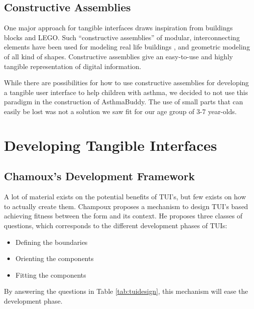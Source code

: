 \subsection{Constructive Assemblies}
One major approach for tangible interfaces draws inspiration from buildings blocks and LEGO\texttrademark. Such ``constructive assemblies'' of modular, interconnecting elements have been used for modeling real life buildings \cite{aish1984architecture}, and geometric modeling of all kind of shapes\cite{anderson2000tangible}. Constructive assemblies give an easy-to-use and highly tangible representation of digital information. 

While there are possibilities for how to use constructive assemblies for developing a tangible user interface to help children with asthma, we decided to not use this paradigm in the construction of AsthmaBuddy. The use of small parts that can easily be lost was not a solution we saw fit for our age group of 3-7 year-olds.


\section{Developing Tangible Interfaces}

\subsection{Chamoux's Development Framework}
A lot of material exists on the potential benefits of TUI's, but few exists on how to actually create them. Champoux proposes a mechanism to design TUI's based achieving fitness between the form and its context\cite{subramaniandesign}.
He proposes three classes of questions, which corresponds to the different development phases of TUIs:
\begin{itemize}
  \item Defining the boundaries
  \item Orienting the components
  \item Fitting the components
\end{itemize} 


By answering the questions in Table \ref{tab:tuidesign}, this mechanism will ease the development phase.   


